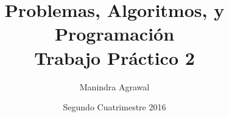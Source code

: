 \documentclass{article}
\title{Problemas, Algoritmos, y Programación \\ Trabajo Práctico 2}
\author{Manindra Agrawal}
\date{Segundo Cuatrimestre 2016}
\begin{document}
\maketitle{}

\newpage
\tableofcontents





\end{document}
